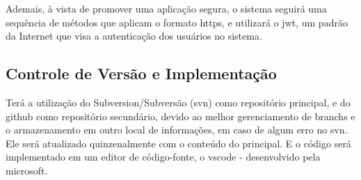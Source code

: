 Ademais, à vista de promover uma aplicação segura, o sistema seguirá uma sequência de métodos que aplicam o formato \gls{https}, e utilizará o \gls{jwt}, um padrão da Internet que visa a autenticação dos usuários no sistema.

\subsection{Controle de Versão e Implementação}
Terá a utilização do Subversion/Subversão (\gls{svn}) como repositório principal, e do \gls{github} como repositório secundário, devido ao melhor gerenciamento de branchs e o armazenamento em outro local de informações, em caso de algum erro no \gls{svn}. Ele será atualizado quinzenalmente com o conteúdo do principal. 
E o código será implementado em um editor de código-fonte, o \ac{vscode} - desenvolvido pela \gls{microsoft}.







